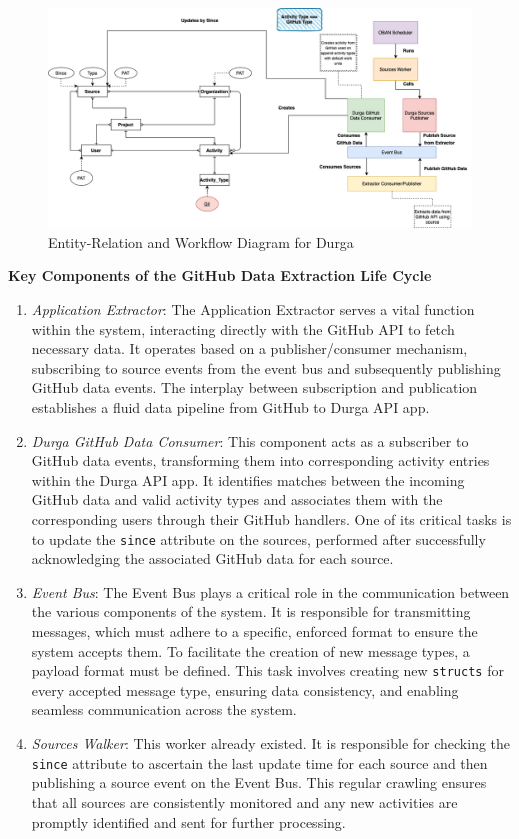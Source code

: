 \begin{figure}[htbp]
	\centering
	\includegraphics[scale=0.4]{figures/diagram.png}  %
	\caption{Entity-Relation and Workflow Diagram for Durga}
	\label{durga}
\end{figure}

\textbf{Key Components of the GitHub Data Extraction Life Cycle}

\begin{enumerate}
    \item \textit{Application Extractor}: The Application Extractor serves a vital function within the system, interacting directly with the GitHub API to fetch necessary data. It operates based on a publisher/consumer mechanism, subscribing to source events from the event bus and subsequently publishing GitHub data events. The interplay between subscription and publication establishes a fluid data pipeline from GitHub to Durga API app.
    \item  \textit{Durga GitHub Data Consumer}: This component acts as a subscriber to GitHub data events, transforming them into corresponding activity entries within the Durga API app. It identifies matches between the incoming GitHub data and valid activity types and associates them with the corresponding users through their GitHub handlers. One of its critical tasks is to update the \texttt{since} attribute on the sources, performed after successfully acknowledging the associated GitHub data for each source.
    \item \textit{Event Bus}: The Event Bus plays a critical role in the communication between the various components of the system. It is responsible for transmitting messages, which must adhere to a specific, enforced format to ensure the system accepts them. To facilitate the creation of new message types, a payload format must be defined. This task involves creating new \texttt{structs} for every accepted message type, ensuring data consistency, and enabling seamless communication across the system. 
    \item \textit{Sources Walker}: This worker already existed. It is responsible for checking the \texttt{since} attribute to ascertain the last update time for each source and then publishing a source event on the Event Bus. This regular crawling ensures that all sources are consistently monitored and any new activities are promptly identified and sent for further processing.
\end{enumerate}

